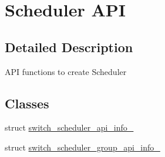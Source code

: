 \hypertarget{group__Scheduler}{\section{Scheduler A\+P\+I}
\label{group__Scheduler}
}


\subsection{Detailed Description}
A\+P\+I functions to create Scheduler \subsection*{Classes}
\begin{DoxyCompactItemize}
\item 
struct \hyperlink{structswitch__scheduler__api__info__}{switch\+\_\+scheduler\+\_\+api\+\_\+info\+\_\+}
\item 
struct \hyperlink{structswitch__scheduler__group__api__info__}{switch\+\_\+scheduler\+\_\+group\+\_\+api\+\_\+info\+\_\+}
\end{DoxyCompactItemize}
